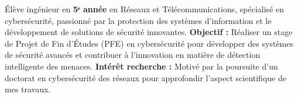 
\begin{cvparagraph}

    Élève ingénieur en \textbf{5ᵉ année} en Réseaux et Télécommunications, spécialisé en cybersécurité, passionné par la protection des systèmes d'information et le développement de solutions de sécurité innovantes.
    \newline
    \textbf{Objectif :} Réaliser un stage de Projet de Fin d'Études (PFE) en cybersécurité pour développer des systèmes de sécurité avancés et contribuer à l'innovation en matière de détection intelligente des menaces.
    \newline
    \textbf{Intérêt recherche :} Motivé par la poursuite d'un doctorat en cybersécurité des réseaux pour approfondir l'aspect scientifique de mes travaux.

\end{cvparagraph}